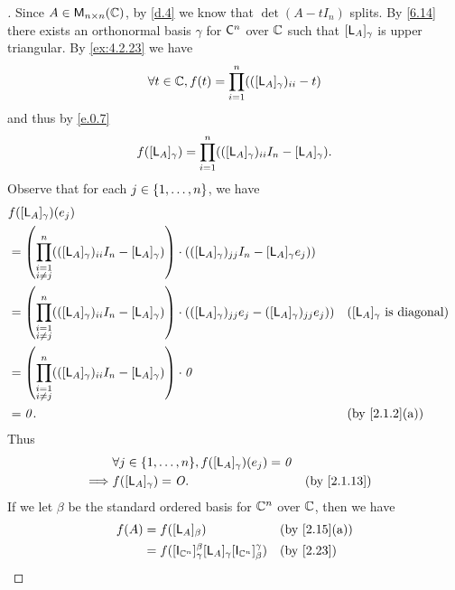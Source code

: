 \begin{proof}[]
  Since \(A \in \mathsf{M}_{{n} \times n}({\mathbb{C}})\), by \cref{d.4} we know that \(\det(A - t I_n)\) splits.
  By \cref{6.14} there exists an orthonormal basis \(\gamma\) for \(\mathsf{C}^n\) over \(\mathbb{C}\) such that \([\mathsf{L}_A]_{\gamma}\) is upper triangular.
  By \cref{ex:4.2.23} we have
  \[
    \forall t \in \mathbb{C}, f(t) = \prod_{i = 1}^n (([\mathsf{L}_A]_{\gamma})_{i i} - t)
  \]
  and thus by \cref{e.0.7}
  \[
    f([\mathsf{L}_A]_{\gamma}) = \prod_{i = 1}^n (([\mathsf{L}_A]_{\gamma})_{i i} I_n - [\mathsf{L}_A]_{\gamma}).
  \]
  Observe that for each \(j \in \left\lbrace1, \dots, n\right\rbrace\), we have
  \begin{align*}
     & f([\L_A]_{\gamma})(e_j)                                       \\
     & = \pa{\prod_{\substack{i = 1                                  \\ i \neq j}}^n (([\L_A]_{\gamma})_{i i} I_n - [\L_A]_{\gamma})} \cdot (([\L_A]_{\gamma})_{j j} I_n - [\L_A]_{\gamma} e_j))         \\
     & = \pa{\prod_{\substack{i = 1                                  \\ i \neq j}}^n (([\L_A]_{\gamma})_{i i} I_n - [\L_A]_{\gamma})} \cdot (([\L_A]_{\gamma})_{j j} e_j - ([\L_A]_{\gamma})_{j j} e_j)) && \text{(\([\L_A]_{\gamma}\) is diagonal)} \\
     & = \pa{\prod_{\substack{i = 1                                  \\ i \neq j}}^n (([\L_A]_{\gamma})_{i i} I_n - [\L_A]_{\gamma})} \cdot \zv \\
     & = \zv.                       &  & \text{(by \cref{2.1.2}(a))}
  \end{align*}
  Thus
  \begin{align*}
             & \forall j \in \set{1, \dots, n}, f([\L_A]_{\gamma})(e_j) = \zv                                \\
    \implies & f([\L_A]_{\gamma}) = \zm.                                      &  & \text{(by \cref{2.1.13})}
  \end{align*}
  If we let \(\beta\) be the standard ordered basis for \(\mathbb{C}^n\) over \(\mathbb{C}\), then we have
  \begin{align*}
    f(A) & = f([\L_A]_{\beta})                                                                                                                                                               &  & \text{(by \cref{2.15}(a))}    \\
         & = f([\IT[\C^n]]_{\gamma}^{\beta} [\L_A]_{\gamma} [\IT[\C^n]]_{\beta}^{\gamma})                                                                                                    &  & \text{(by \cref{2.23})}       \\

\end{align*}
\end{proof}
